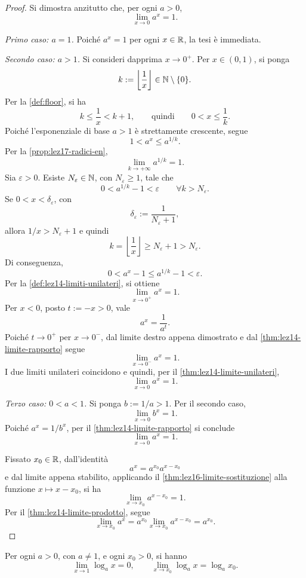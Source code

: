 \begin{proof}
Si dimostra anzitutto che, per ogni \(a>0\),
\[
  \lim_{x\to0}a^x=1.
\]

\emph{Primo caso: \(a=1\).}
Poiché \(a^x=1\) per ogni \(x\in\mathbb{R}\), la tesi
è immediata.

\emph{Secondo caso: \(a>1\).}
Si consideri dapprima \(x\to0^+\). Per \(x\in(0,1)\),
si ponga
\[
  k:=\left\lfloor\frac1x\right\rfloor\in\mathbb{N}\setminus\{0\}.
\]
Per la \cref{def:floor}, si ha
\[
  k\le\frac1x<k+1,
  \qquad\text{quindi}\qquad
  0<x\le\frac1k.
\]
Poiché l'esponenziale di base \(a>1\) è strettamente
crescente, segue
\[
  1<a^x\le a^{1/k}.
\]
Per la \cref{prop:lez17-radici-en},
\[
  \lim_{k\to+\infty}a^{1/k}=1.
\]
Sia \(\varepsilon>0\). Esiste \(N_\varepsilon\in\mathbb{N}\),
con \(N_\varepsilon\ge1\), tale che
\[
  0<a^{1/k}-1<\varepsilon
  \qquad\forall k>N_\varepsilon.
\]
Se \(0<x<\delta_\varepsilon\), con
\[
  \delta_\varepsilon:=\frac1{N_\varepsilon+1},
\]
allora \(1/x>N_\varepsilon+1\) e quindi
\[
  k=\left\lfloor\frac1x\right\rfloor
  \ge N_\varepsilon+1>N_\varepsilon.
\]
Di conseguenza,
\[
  0<a^x-1\le a^{1/k}-1<\varepsilon.
\]
Per la \cref{def:lez14-limiti-unilateri}, si ottiene
\[
  \lim_{x\to0^+}a^x=1.
\]
Per \(x<0\), posto \(t:=-x>0\), vale
\[
  a^x=\frac1{a^t}.
\]
Poiché \(t\to0^+\) per \(x\to0^-\), dal limite
destro appena dimostrato e dal
\cref{thm:lez14-limite-rapporto} segue
\[
  \lim_{x\to0^-}a^x=1.
\]
I due limiti unilateri coincidono e quindi, per
il \cref{thm:lez14-limite-unilateri},
\[
  \lim_{x\to0}a^x=1.
\]

\emph{Terzo caso: \(0<a<1\).}
Si ponga \(b:=1/a>1\). Per il secondo caso,
\[
  \lim_{x\to0}b^x=1.
\]
Poiché \(a^x=1/b^x\), per il
\cref{thm:lez14-limite-rapporto} si conclude
\[
  \lim_{x\to0}a^x=1.
\]

Fissato \(x_0\in\mathbb{R}\), dall'identità
\[
  a^x=a^{x_0}a^{x-x_0}
\]
e dal limite appena stabilito, applicando il
\cref{thm:lez16-limite-sostituzione} alla funzione
\(x\longmapsto x-x_0\), si ha
\[
  \lim_{x\to x_0}a^{x-x_0}=1.
\]
Per il \cref{thm:lez14-limite-prodotto}, segue
\[
  \lim_{x\to x_0}a^x
  =a^{x_0}\lim_{x\to x_0}a^{x-x_0}
  =a^{x_0}.
\]
\end{proof}

\begin{example}
\label{ex:lez18-limiti-logaritmo}
Per ogni \(a>0\), con \(a\ne1\), e ogni \(x_0>0\),
si hanno
\[
  \lim_{x\to1}\log_a x=0,
  \qquad
  \lim_{x\to x_0}\log_a x=\log_a x_0.
\]
\end{example}

